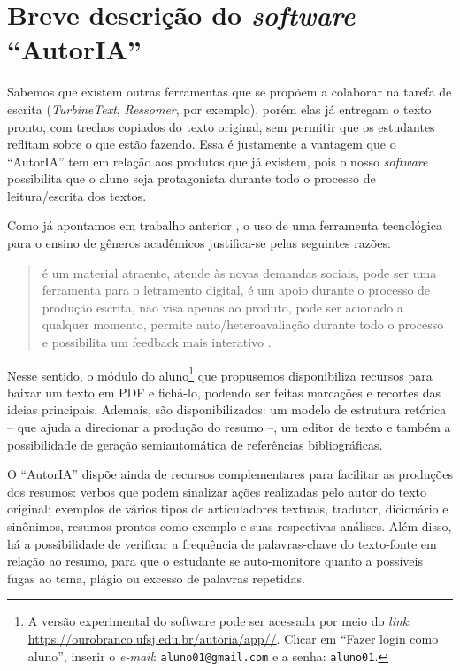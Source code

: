 \documentclass[portuguese]{textolivre}
\begin{document}
\section{Breve descrição do \textit{software} “AutorIA”}\label{sec-fmt-manuscrito}
Sabemos que existem outras ferramentas que se propõem a colaborar na tarefa de escrita (\textit{TurbineText}, \textit{Ressomer}, por exemplo), porém elas já entregam o texto pronto, com trechos copiados do texto original, sem permitir que os estudantes reflitam sobre o que estão fazendo. Essa é justamente a vantagem que o “AutorIA” tem em relação aos produtos que já existem, pois o nosso \textit{software} possibilita que o aluno seja protagonista durante todo o processo de leitura/escrita dos textos.

Como já apontamos em trabalho anterior \cite{caetanooliveira2021}, o uso de uma ferramenta tecnológica para o ensino de gêneros acadêmicos justifica-se pelas seguintes razões:

\begin{quote}
    é um material atraente, atende às novas demandas sociais, pode ser uma ferramenta para o letramento digital, é um apoio durante o processo de produção escrita, não visa apenas ao produto, pode ser acionado a qualquer momento, permite auto/heteroavaliação durante todo o processo e possibilita um feedback mais interativo \cite[p.~1410]{caetanooliveira2021}.
\end{quote}

Nesse sentido, o módulo do aluno\footnote{A versão experimental do software pode ser acessada por meio do \textit{link}: \url{https://ourobranco.ufsj.edu.br/autoria/app//}. Clicar em “Fazer login como aluno”, inserir o \textit{e-mail}: \texttt{aluno01@gmail.com} e a senha: \texttt{aluno01}.} que propusemos disponibiliza recursos para baixar um texto em PDF e fichá-lo, podendo ser feitas marcações e recortes das ideias principais. Ademais, são disponibilizados: um modelo de estrutura retórica -- que ajuda a direcionar a produção do resumo --, um editor de texto e também a possibilidade de geração semiautomática de referências bibliográficas.

O “AutorIA” dispõe ainda de recursos complementares para facilitar as produções dos resumos: verbos que podem sinalizar ações realizadas pelo autor do texto original; exemplos de vários tipos de articuladores textuais, tradutor, dicionário e sinônimos, resumos prontos como exemplo e suas respectivas análises. Além disso, há a possibilidade de verificar a frequência de palavras-chave do texto-fonte em relação ao resumo, para que o estudante se auto-monitore quanto a possíveis fugas ao tema, plágio ou excesso de palavras repetidas.
\end{document}
